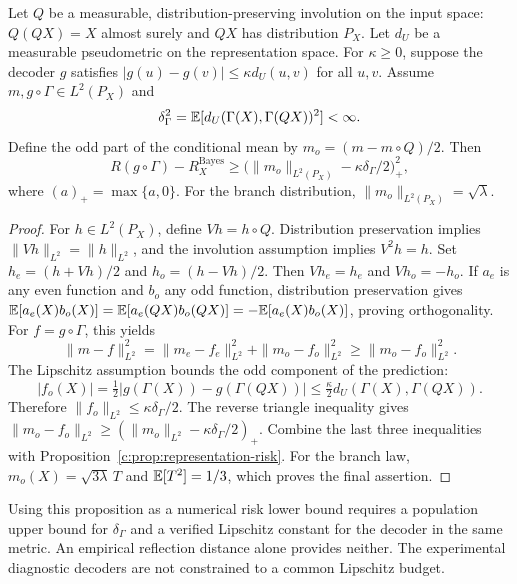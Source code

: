 \begin{proposition}
\label{c:prop:approx-symmetry}
Let $Q$ be a measurable, distribution-preserving involution on the input
space: $Q(QX)=X$ almost surely and $QX$ has distribution $P_X$.
Let $d_U$ be a measurable pseudometric on the representation space. For
$\kappa\geq0$, suppose the decoder $g$ satisfies
$|g(u)-g(v)|\leq\kappa d_U(u,v)$ for all $u,v$. Assume
$m,g\circ\Gamma\in L^2(P_X)$ and
\[
 \delta_\Gamma^2=
 \mathbb{E}[d_U(\Gamma(X),\Gamma(QX))^2]<\infty.
\]
Define the odd part of the conditional mean by
$m_o=(m-m\circ Q)/2$. Then
\[
 R(g\circ\Gamma)-R_X^{\mathrm{Bayes}}
 \geq\bigl(\|m_o\|_{L^2(P_X)}-\kappa\delta_\Gamma/2\bigr)_+^2,
\]
where $(a)_+=\max\{a,0\}$. For the branch distribution,
$\|m_o\|_{L^2(P_X)}=\sqrt\lambda$.
\end{proposition}
\begin{proof}
For $h\in L^2(P_X)$, define $Vh=h\circ Q$. Distribution preservation
implies $\|Vh\|_{L^2}=\|h\|_{L^2}$, and the involution assumption
implies $V^2h=h$. Set $h_e=(h+Vh)/2$ and $h_o=(h-Vh)/2$.
Then $Vh_e=h_e$ and $Vh_o=-h_o$. If $a_e$ is any even function and
$b_o$ any odd function, distribution preservation gives
$\mathbb{E}[a_e(X)b_o(X)]=\mathbb{E}[a_e(QX)b_o(QX)]
=-\mathbb{E}[a_e(X)b_o(X)]$, proving orthogonality.
For $f=g\circ\Gamma$, this yields
\[
 \|m-f\|_{L^2}^2
 =\|m_e-f_e\|_{L^2}^2+\|m_o-f_o\|_{L^2}^2
 \geq\|m_o-f_o\|_{L^2}^2.
\]
The Lipschitz assumption bounds the odd component of the prediction:
\[
 |f_o(X)|=\tfrac12|g(\Gamma(X))-g(\Gamma(QX))|
 \leq\tfrac\kappa2d_U(\Gamma(X),\Gamma(QX)).
\]
Therefore $\|f_o\|_{L^2}\leq\kappa\delta_\Gamma/2$. The reverse
triangle inequality gives
$\|m_o-f_o\|_{L^2}\geq
(\|m_o\|_{L^2}-\kappa\delta_\Gamma/2)_+$.
Combine the last three inequalities with
Proposition~\ref{c:prop:representation-risk}. For the branch law,
$m_o(X)=\sqrt{3\lambda}\,T$ and $\mathbb{E}[T^2]=1/3$, which proves the
final assertion.
\end{proof}

Using this proposition as a numerical risk lower bound requires a
population upper bound for $\delta_\Gamma$ and a verified Lipschitz
constant for the decoder in the same metric. An empirical reflection
distance alone provides neither. The experimental diagnostic decoders
are not constrained to a common Lipschitz budget.

